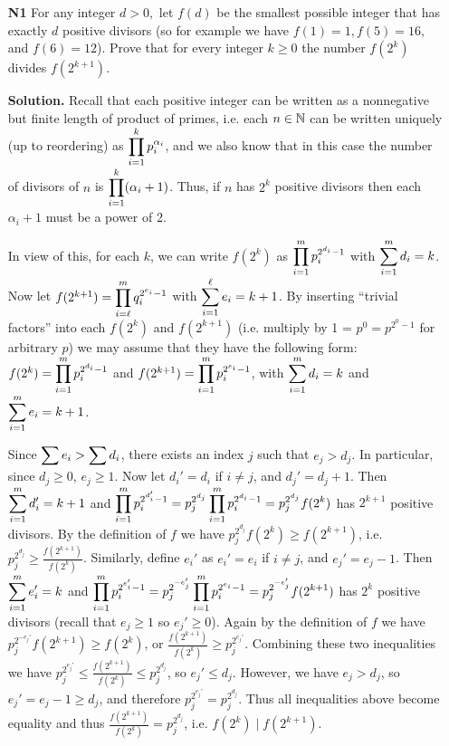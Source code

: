 \documentclass[11pt,a4paper]{article}
\begin{document}
\begin{enumerate}
	\item [\textbf{N1}] For any integer $d > 0,$ let $f(d)$ be the smallest possible integer that has exactly $d$ positive divisors (so for example we have $f(1)=1, f(5)=16,$ and $f(6)=12$). Prove that for every integer $k \geq 0$ the number $f\left(2^k\right)$ divides $f\left(2^{k+1}\right).$
	
	\textbf{Solution.} Recall that each positive integer can be written as a nonnegative but finite length of product of primes, i.e. each $n\in\mathbb{N}$ can be written uniquely (up to reordering) as $\displaystyle\prod_{i=1}^k p_i^{\alpha_i}$, and we also know that in this case the number of divisors of $n$ is $\displaystyle\prod_{i=1}^k (\alpha_i+1)$. Thus, if $n$ has $2^k$ positive divisors then each $\alpha_i+1$ must be a power of 2. 
	
	In view of this, for each $k$, we can write $f(2^k)$ as 
	$\displaystyle\prod_{i=1}^m p_i^{2^{d_i}-1}$ with $\displaystyle\sum_{i=1}^m d_i=k$. 
	Now let $f(2^{k+1})=\displaystyle\prod_{i=\ell}^m q_i^{2^{e_i}-1}$ with $\displaystyle\sum_{i=1}^{\ell} e_i=k+1$. By inserting ``trivial factors'' into each $f(2^k)$ and $f(2^{k+1})$ (i.e. multiply by 1 = $p^0=p^{2^0-1}$ for arbitrary $p$) we may assume that they have the following form: 
	$f(2^k)=\displaystyle\prod_{i=1}^m p_i^{2^{d_i}-1}$ and $f(2^{k+1})=\displaystyle\prod_{i=1}^m p_i^{2^{e_i}-1}$, with $\displaystyle\sum_{i=1}^m d_i=k$ and $\displaystyle\sum_{i=1}^m e_i=k+1$. 
	
	Since $\displaystyle\sum e_i>\displaystyle\sum d_i$, there exists an index $j$ such that $e_j>d_j$. In particular, since $d_j\ge 0$, $e_j\ge 1$. Now let $d_i'=d_i$ if $i\neq j$, and $d_j'=d_j+1$. Then $\displaystyle\sum_{i=1}^m d_i'=k+1$ and 
	$\displaystyle\prod_{i=1}^m p_i^{2^{d_i'}-1}=p_j^{2^{d_j}}\displaystyle\prod_{i=1}^m p_i^{2^{d_i}-1}=p_j^{2^{d_j}}f(2^k)$ has $2^{k+1}$ positive divisors. By the definition of $f$ we have $p_j^{2^{d_j}}f(2^k)\ge f(2^{k+1})$, 
	i.e. $p_j^{2^{d_j}}\ge \frac{f(2^{k+1})}{f(2^k)}$. 
	Similarly, define $e_i'$ as $e_i'=e_i$ if $i\neq j$, and $e_j'=e_j-1$. 
	Then $\displaystyle\sum_{i=1}^m e_i'=k$ and $\displaystyle\prod_{i=1}^m p_i^{2^{e_i'}-1}=p_j^{2^{-e_j'}}\displaystyle\prod_{i=1}^m p_i^{2^{e_i}-1}=p_j^{2^{-e_j'}} f(2^{k+1})$ has $2^k$ positive divisors (recall that $e_j\ge 1$ so $e_j'\ge 0$). 
	Again by the definition of $f$ we have $p_j^{2^{-e_j'}} f(2^{k+1})\ge f(2^k)$, or 
	$\frac{f(2^{k+1})}{f(2^k)}\ge p_j^{2^{e_j'}}. $ 
	Combining these two inequalities we have $p_j^{2^{e_j'}}\le \frac{f(2^{k+1})}{f(2^k)}\le p_j^{2^{d_j}}$, so $e_j'\le d_j$. However, we have $e_j>d_j$, so $e_j'=e_j-1\ge d_j$, and therefore $p_j^{2^{e_j'}}=p_j^{2^{d_j}}$. 
	Thus all inequalities above become equality and thus $\frac{f(2^{k+1})}{f(2^k)}= p_j^{2^{d_j}}$, i.e. $f(2^k)\mid f(2^{k+1})$. 
	

\end{enumerate}
\end{document}

